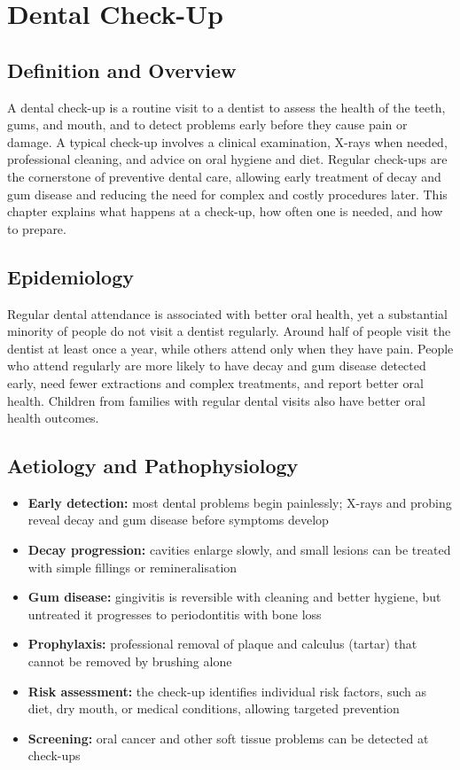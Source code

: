 \chapter{Dental Check-Up}

\section*{Definition and Overview}
A dental check-up is a routine visit to a dentist to assess the health of the teeth, gums, and mouth, and to detect problems early before they cause pain or damage. A typical check-up involves a clinical examination, X-rays when needed, professional cleaning, and advice on oral hygiene and diet. Regular check-ups are the cornerstone of preventive dental care, allowing early treatment of decay and gum disease and reducing the need for complex and costly procedures later. This chapter explains what happens at a check-up, how often one is needed, and how to prepare.

\section*{Epidemiology}
Regular dental attendance is associated with better oral health, yet a substantial minority of people do not visit a dentist regularly. Around half of people visit the dentist at least once a year, while others attend only when they have pain. People who attend regularly are more likely to have decay and gum disease detected early, need fewer extractions and complex treatments, and report better oral health. Children from families with regular dental visits also have better oral health outcomes.

\section*{Aetiology and Pathophysiology}
\begin{itemize}
    \item \textbf{Early detection:} most dental problems begin painlessly; X-rays and probing reveal decay and gum disease before symptoms develop
    \item \textbf{Decay progression:} cavities enlarge slowly, and small lesions can be treated with simple fillings or remineralisation
    \item \textbf{Gum disease:} gingivitis is reversible with cleaning and better hygiene, but untreated it progresses to periodontitis with bone loss
    \item \textbf{Prophylaxis:} professional removal of plaque and calculus (tartar) that cannot be removed by brushing alone
    \item \textbf{Risk assessment:} the check-up identifies individual risk factors, such as diet, dry mouth, or medical conditions, allowing targeted prevention
    \item \textbf{Screening:} oral cancer and other soft tissue problems can be detected at check-ups
\end{itemize}

